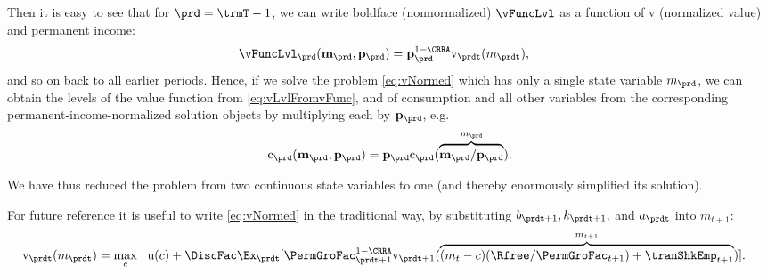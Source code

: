\documentclass[titlepage, headings=optiontotocandhead]{econtex}
\begin{document}
Then it is easy to see that for $\prd=\trmT-1$, we can write boldface (nonnormalized) $\vFuncLvl$ as a function of $\mathrm{v}$ (normalized value) and permanent income:
\begin{equation}\begin{gathered}\begin{aligned}
      \vFuncLvl_{\prd}(\mathbf{m}_{\prd},\mathbf{p}_{\prd}) & =  \mathbf{p}_{\prd}^{1-\CRRA}\mathrm{v}_{\prdt}(m_{\prdt}), \label{eq:vLvlFromvFunc}
    \end{aligned}\end{gathered}\end{equation}
and so on back to all earlier periods.  Hence, if we solve the problem \eqref{eq:vNormed} which has only a single state variable $m_{\prd}$, we can obtain the levels of the value function from \eqref{eq:vLvlFromvFunc}, and of consumption and all other variables from the corresponding permanent-income-normalized solution objects by multiplying each by $\mathbf{p}_{\prd}$, e.g.\
\begin{equation*}\begin{gathered}\begin{aligned}
  \mathrm{c}_{\prd}(\mathbf{m}_{\prd},\mathbf{p}_{\prd})=\mathbf{p}_{\prd}\mathrm{c}_{\prd}(\overbrace{\mathbf{m}_{\prd}/\mathbf{p}_{\prd}}^{m_{\prd}}).
    \end{aligned}\end{gathered}\end{equation*}

We have thus reduced the problem from two continuous state variables to one (and thereby enormously simplified its solution).

For future reference it is useful to write \eqref{eq:vNormed} in the traditional way, by substituting $b_{\prdt+1},k_{\prdt+1},$ and $a_{\prdt}$ into $m_{t+1}$:
\begin{equation}\begin{gathered}\begin{aligned}
      \mathrm{v}_{\prdt}(m_{\prdt}) & = \max_{c} ~~ \mathrm{u}(c)+ \DiscFac \Ex_{\prdt}[ \PermGroFac_{\prdt+1}^{1-\CRRA}\mathrm{v}_{\prdt+1}(\overbrace{(m_{t}-c)(\Rfree/\PermGroFac_{t+1})+\tranShkEmp_{t+1}}^{m_{t+1}})] \label{eq:vusual}.
    \end{aligned}\end{gathered}\end{equation}
\end{document}
